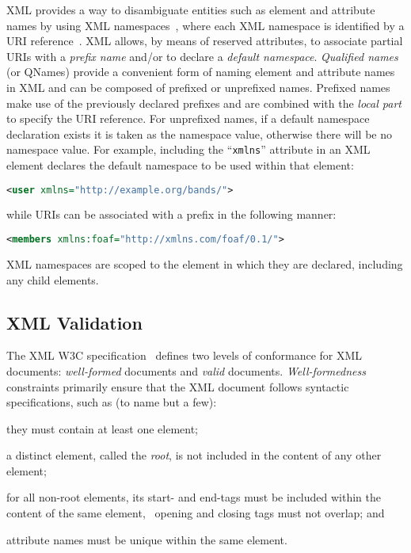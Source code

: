 \ac{XML} provides a way to disambiguate entities such as element and attribute names by using \ac{XML}
namespaces~\cite{BrayHollanderLayman:2009aa}, where each \ac{XML} namespace is identified by a URI
reference~\cite{Berners-LeeFieldingMasinter:2005aa}.
%
\ac{XML} allows, by means of reserved attributes, to associate partial \acp{URI} with a \emph{prefix name} and/or to
declare a \emph{default namespace}.
%
\emph{Qualified names} (or QNames) provide a convenient form of naming element and attribute names in \ac{XML} and can
be composed of prefixed or unprefixed names.  Prefixed names make use of the previously declared prefixes and are
combined with the \emph{local part} to specify the \ac{URI} reference.
%
For unprefixed names, if a default namespace declaration exists it is taken as the namespace value, otherwise there will
be no namespace value.
%
For example, including the ``\verb+xmlns+'' attribute in an \ac{XML} element declares the default namespace to be used
within that element:
%
\begin{lstlisting}[language=XML,basicstyle=\small\ttfamily,frame=none,numbers=none]
<user xmlns="http://example.org/bands/">
\end{lstlisting}
%
while \acp{URI} can be associated with a prefix in the following manner:
%
\begin{lstlisting}[language=XML,basicstyle=\small\ttfamily,frame=none,numbers=none]
<members xmlns:foaf="http://xmlns.com/foaf/0.1/">
\end{lstlisting} 
%
\ac{XML} namespaces are scoped to the element in which they are declared, including any child elements.


\subsection{XML Validation}
\label{sec:xml-validation}


The \ac{XML} \ac{W3C} specification~\cite{BrayPaoliSperberg-Mcqueen:2008aa} defines two levels of conformance for
\ac{XML} documents: \emph{well-formed} documents and \emph{valid} documents.  \emph{Well-formedness} constraints
primarily ensure that the \ac{XML} document follows syntactic specifications, such as (to name but a few):
\begin{inparaenum}[(i)]
\item they must contain at least one element;
\item a distinct element, called the \emph{root}, is not included in the content of any other element;
\item for all non-root elements, its start- and end-tags must be included within the content of the same element,
  \ie~opening and closing tags must not overlap; and
\item attribute names must be unique within the same element.
\end{inparaenum}

